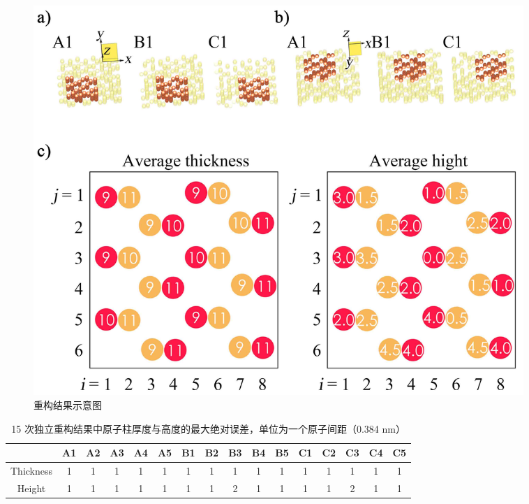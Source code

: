 \begin{figure}[H]
	\vspace{\baselineskip}
	\centering
	\includegraphics[width=0.9\textwidth]{../2.16/216}
	\caption{重构结果示意图}\label{fig:216}
	\song{}
\end{figure}

\quad

\quad

\quad

\begin{table}[H]
	\caption{15 次独立重构结果中原子柱厚度与高度的最大绝对误差，单位为一个原子间距（0.384 nm）}\label{tab:table1}	
	\vspace{0.5em}\centering\wuhao
	\begin{tabular}{c!{\vrule width 1pt}ccccccccccccccc}
		\toprule[1.5pt]
		 & A1 & A2 & A3 & A4 & A5 & B1 & B2 & B3 & B4 & B5 & C1 & C2 & C3 & C4 & C5 \\
		\midrule[1pt]
		Thickness & 1 & 1 & 1 & 1 & 1 & 1 & 1 & 1 &1 & 1 & 1 &1 &1 &1 & 1\\
		Height & 1 & 1 & 1 & 1 & 1 & 1 & 1 & 2 &1 & 1 & 1 &1 &2 &1 & 1\\
		\bottomrule[1.5pt]
	\end{tabular}
	\vspace{\baselineskip}
\end{table}


